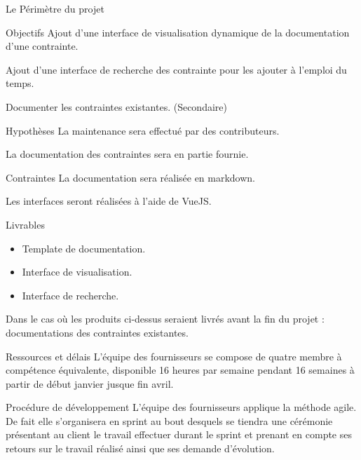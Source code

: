 \documentclass[]{article}
\begin{document}
    \begin{section}{Le Périmètre du projet}
        \begin{subsection}{Objectifs}
            Ajout d’une interface de visualisation dynamique de la documentation d’une contrainte.

            Ajout d’une interface de recherche des contrainte pour les ajouter à l’emploi du temps.

            Documenter les contraintes existantes. (Secondaire)
        \end{subsection}

        \begin{subsection}{Hypothèses}
            La maintenance sera effectué par des contributeurs.

            La documentation des contraintes sera en partie fournie.
        \end{subsection}

        \begin{subsection}{Contraintes}
            La documentation sera réalisée en markdown.

            Les interfaces seront réalisées à l’aide de VueJS.
        \end{subsection}

        \begin{subsection}{Livrables}
            \begin{itemize}
                \item Template de documentation.
                \item Interface de visualisation.
                \item Interface de recherche.
            \end{itemize}

            Dans le cas où les produits ci-dessus seraient livrés avant la fin du projet : 
            documentations des contraintes existantes.
        \end{subsection}

        \begin{subsection}{Ressources et délais}
            L’équipe des fournisseurs se compose de quatre membre à compétence équivalente, disponible 16 heures par semaine 
            pendant 16 semaines à partir de début janvier jusque fin avril.           
        \end{subsection}

        \begin{subsection}{Procédure de développement}
            L’équipe des fournisseurs applique la méthode agile. De fait elle s’organisera en sprint au bout desquels se tiendra 
            une cérémonie présentant au client le travail effectuer durant le sprint et prenant en compte ses retours sur le 
            travail réalisé ainsi que ses demande d’évolution.


\end{subsection}
\end{section}
\end{document}
